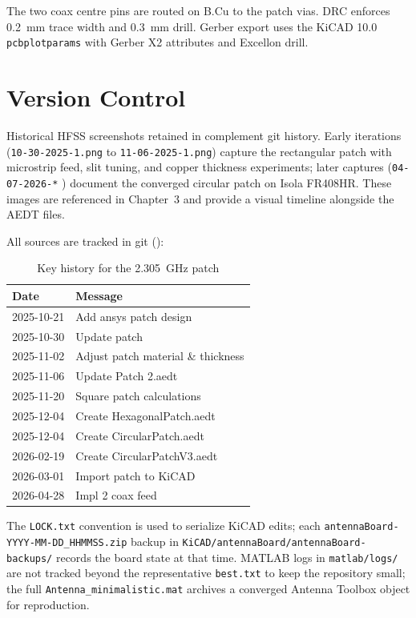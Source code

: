 The two coax centre pins are routed on B.Cu to the patch vias. DRC enforces 0.2~mm trace width and 0.3~mm drill. Gerber export uses the KiCAD 10.0 \texttt{pcbplotparams} with Gerber X2 attributes and Excellon drill.

\section{Version Control}

Historical HFSS screenshots retained in  complement git history. Early iterations (\texttt{10-30-2025-1.png} to \texttt{11-06-2025-1.png}) capture the rectangular patch with microstrip feed, slit tuning, and copper thickness experiments; later captures (\texttt{04-07-2026-*} ) document the converged circular patch on Isola FR408HR. These images are referenced in Chapter~3 and provide a visual timeline alongside the AEDT files.

All sources are tracked in git ():

\begin{table}[H]
\centering
\caption{Key history for the 2.305~GHz patch}
\label{tab:githistory}
\begin{tabular}{l p{10cm}}
\toprule
Date & Message \\
\midrule
2025-10-21 & Add ansys patch design \\
2025-10-30 & Update patch \\
2025-11-02 & Adjust patch material \& thickness \\
2025-11-06 & Update Patch 2.aedt \\
2025-11-20 & Square patch calculations \\
2025-12-04 & Create HexagonalPatch.aedt \\
2025-12-04 & Create CircularPatch.aedt \\
2026-02-19 & Create CircularPatchV3.aedt \\
2026-03-01 & Import patch to KiCAD \\
2026-04-28 & Impl 2 coax feed \\
\bottomrule
\end{tabular}
\end{table}

The \texttt{LOCK.txt} convention is used to serialize KiCAD edits; each \texttt{antennaBoard-YYYY-MM-DD\_HHMMSS.zip} backup in \texttt{KiCAD/antennaBoard/antennaBoard-backups/} records the board state at that time. MATLAB logs in \texttt{matlab/logs/} are not tracked beyond the representative \texttt{best.txt} to keep the repository small; the full \texttt{Antenna\_minimalistic.mat} archives a converged Antenna Toolbox object for reproduction.

